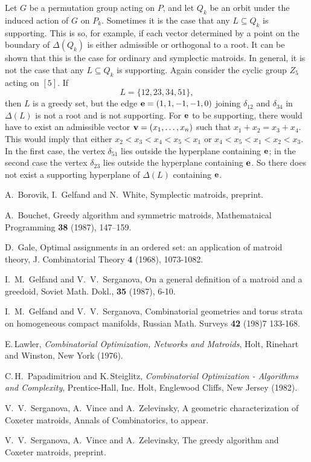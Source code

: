 \documentclass[12pt]{article}
\begin{document}
Let $G$ be a permutation group acting on $P$, and let $Q_k$ be an orbit under the induced
action of $G$ on $P_k$.  Sometimes it is the case that any  $L \subseteq Q_k$ is supporting.
This is so, for example, if each vector determined by a point on the boundary of
$\Delta (Q_k)$ is either admissible or orthogonal to a root.  It can be shown that
this is the case for ordinary and symplectic matroids.
In general, it is not the case that any  $L \subseteq Q_k$ is supporting.
Again consider the cyclic group $Z_5$ acting on
$[5]$.  If
$$L = \{ 12, 23, 34, 51 \},$$
then $L$ is a greedy set, but the edge ${\bf e} = (1,1,-1,-1,0)$
joining $\delta_{12}$ and $\delta_{34}$ in $\Delta (L)$ is not a root
and is not supporting.  For ${\bf e}$ to be supporting, there would
have to exist an admissible vector ${\bf v} = (x_1, \dots,x_n)$ such
that $x_1+x_2 = x_3+x_4$.  This would imply that either $x_2 < x_3 < x_4 <
x_5 < x_1$ or $x_4 < x_5 < x_1 < x_2 < x_3$.  In the first case, the
vertex $\delta_{51}$ lies outside the hyperplane containing ${\bf e}$;
in the second case the vertex $\delta_{23}$ lies outside the hyperplane
containing ${\bf e}$.  So there does not exist a supporting
hyperplane of  $\Delta (L)$ containing ${\bf e}$.

\begin{thebibliography}{9}

 A.\, Borovik, I.\, Gelfand and N.\, White,
Symplectic matroids, preprint.

 A.\, Bouchet, Greedy algorithm and symmetric matroids,
Mathemataical Programming {\bf 38} (1987), 147--159.

 D.\, Gale, Optimal assignments in an
ordered set: an application of matroid theory, J. Combinatorial
Theory {\bf 4} (1968), 1073-1082.

 I.\,  M.\, Gelfand and
V.\, V.\, Serganova, On a general definition of a matroid and a
greedoid, Soviet Math. Dokl., {\bf 35} (1987), 6-10.

 I.\, M.\, Gelfand and V.\, V.\, Serganova,
Combinatorial geometries and torus strata on homogeneous compact
manifolds, Russian Math. Surveys {\bf 42}  (198)7 133-168.

 E.\,Lawler, {\em Combinatorial Optimization, Networks
and Matroids}, Holt, Rinehart and Winston, New York (1976).

 C.\,H.\ Papadimitriou and K.\,Steiglitz, {\em
Combinatorial Optimization - Algorithms and Complexity}, Prentice-Hall,
Inc. Holt, Englewood Cliffs, New Jersey (1982).

 V. \,V.\, Serganova, A.\, Vince and A.\, Zelevinsky,
A geometric characterization of Coxeter matroids,
Annals of Combinatorics, to appear.

 V. \,V.\, Serganova, A.\, Vince and A.\, Zelevinsky,
The greedy algorithm and Coxeter matroids, preprint.

\end{thebibliography}
\end{document}
